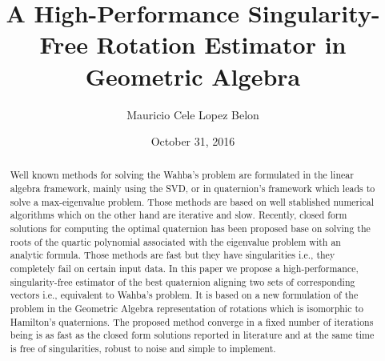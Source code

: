 \documentclass{birkjour}
\numberwithin{equation}{section}
\begin{document}
%
%
%
%
%
%
%
%
%


\title[A High-Performance Singularity-Free Rotation Estimator in Geometric Algebra]
 {A High-Performance Singularity-Free Rotation Estimator in Geometric Algebra}

\author[Mauricio Cele Lopez Belon]{Mauricio Cele Lopez Belon}
\address{Madrid, España}




\date{October 31, 2016}

\begin{abstract}

Well known methods for solving the Wahba's problem are formulated in the linear algebra framework, mainly using the SVD, or in quaternion's framework which leads to solve a max-eigenvalue problem. Those methods are based on well stablished numerical algorithms which on the other hand are iterative and slow. Recently, closed form solutions for computing the optimal quaternion has been proposed base on solving the roots of the quartic polynomial associated with the eigenvalue problem with an analytic formula. Those methods are fast but they have singularities i.e., they completely fail on certain input data. In this paper we propose a high-performance, singularity-free estimator of the best quaternion aligning two sets of corresponding vectors i.e., equivalent to Wahba's problem. It is based on a new formulation of the problem  in the Geometric Algebra representation of rotations which is isomorphic to Hamilton's quaternions.  The proposed method converge in a fixed number of iterations being is as fast as the closed form solutions reported in literature and at the same time is free of singularities, robust to noise and simple to implement.

\end{abstract}
\end{document}
